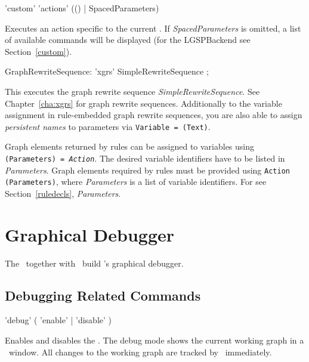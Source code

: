 \begin{rail}
  'custom' 'actions' (() | SpacedParameters)
\end{rail}
Executes an action specific to the current . 
If \emph{SpacedParameters} is omitted, a list of available commands will be displayed (for the LGSPBackend see Section~\ref{custom}).

\makeatletter
\begin{rail}
  GraphRewriteSequence: 'xgrs' SimpleRewriteSequence ;
\end{rail}
This executes the graph rewrite sequence \emph{SimpleRewriteSequence}.
See Chapter~\ref{cha:xgrs} for graph rewrite sequences.
Additionally to the variable assignment in rule-embedded graph rewrite sequences, you are also able to assign \emph{persistent names} to parameters via  \texttt{Variable = \@(Text)}.

Graph elements returned by rules can be assigned to variables using \texttt{(Para\-meters) = \emph{Action}}. 
The desired variable identifiers have to be listed in \emph{Parameters}. 
Graph elements required by rules must be provided using \texttt{Action (Para\-meters)}, where \emph{Parameters} is a list of variable identifiers. 
For  see Section~\ref{ruledecls}, \emph{Parameters}.



\section{Graphical Debugger}
\label{sct:debugger}
The \GrShell\ together with \yComp\ build \GrG's graphical debugger.

\subsection{Debugging Related Commands}

\begin{rail}
  'debug' ( 'enable' | 'disable' )
\end{rail}
Enables and disables the .
The debug mode shows the current working graph in a \yComp\ window.
All changes to the working graph are tracked by \yComp\ immediately.  

